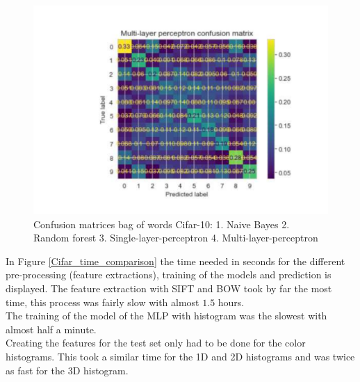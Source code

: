 \documentclass[11pt]{article}
\begin{document}
\begin{figure}[H]
\begin{minipage}[c]{0.5\textwidth}
\end{minipage}
\begin{minipage}[c]{0.5\textwidth}
\includegraphics[width=1\linewidth]{figures/Cifar/CM__MLP_BOW.pdf}
\end{minipage}
\caption{Confusion matrices bag of words Cifar-10: 1. Naive Bayes 2. Random forest 3. Single-layer-perceptron 4. Multi-layer-perceptron}
\label{CV_Matrices_Cifar_BOW}
\end{figure}

In Figure \ref{Cifar_time_comparison} the time needed in seconds for the different pre-processing (feature extractions), training of the models and prediction is displayed. The feature extraction with SIFT and BOW took by far the most time, this process was fairly slow with almost $1.5$ hours.\\
The training of the model of the MLP with histogram was the slowest with almost half a minute.\\
Creating the features for the test set only had to be done for the color histograms. This took a similar time for the 1D and 2D histograms and was twice as fast for the 3D histogram. 
\end{document}
